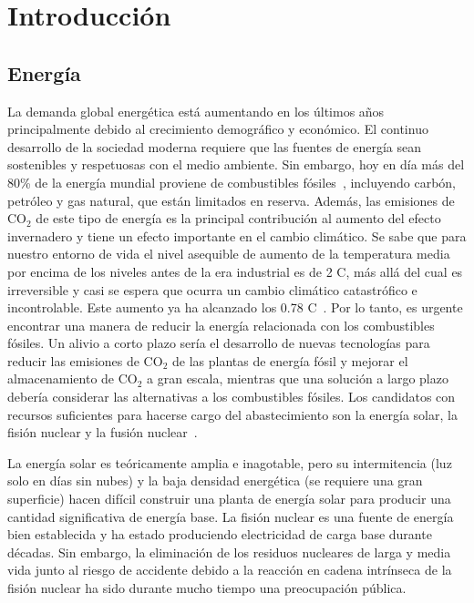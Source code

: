 \chapter{Introducción}\label{ch:intro}
\section{Energía}\label{sec:energy}
La demanda global energética está aumentando en los últimos años principalmente debido al crecimiento demográfico y económico.
El continuo desarrollo de la sociedad moderna requiere que las fuentes de energía sean sostenibles
y respetuosas con el medio ambiente. Sin embargo, hoy en día más del 80\% de la energía mundial proviene
de combustibles fósiles~\cite{/content/publication/caf32f3b-en}, incluyendo carbón, petróleo y gas natural, que están limitados en reserva.
Además, las emisiones de CO$_2$ de este tipo de energía es la principal contribución al aumento del 
efecto invernadero y tiene un efecto importante en el cambio climático. Se
sabe que para nuestro entorno de vida el nivel asequible de aumento de la
temperatura media por encima de los niveles antes de la era industrial es de 2 \centigrade C, más allá del cual es irreversible y casi
se espera que ocurra un cambio climático catastrófico e incontrolable. Este aumento ya ha alcanzado los 0.78 \centigrade C~\cite{ip02000c}.
Por lo tanto, es urgente encontrar una manera de reducir la energía relacionada con
los combustibles fósiles. Un alivio a corto plazo sería el desarrollo de nuevas tecnologías para
reducir las emisiones de CO$_2$ de las plantas de energía fósil y mejorar el almacenamiento de CO$_2$ a gran escala,
mientras que una solución a largo plazo debería considerar las alternativas a los combustibles fósiles. Los candidatos con recursos suficientes para hacerse cargo del abastecimiento son la energía solar, la fisión nuclear y
la fusión nuclear~\cite{Freidberg:1186225}.\par
La energía solar es teóricamente amplia e inagotable, pero su intermitencia (luz solo en días sin nubes) y la baja densidad energética (se requiere una gran superficie) hacen difícil construir
una planta de energía solar para producir una cantidad significativa de energía base. La fisión nuclear es
una fuente de energía bien establecida y ha estado produciendo electricidad de carga base durante décadas.
Sin embargo, la eliminación de los residuos nucleares de larga y media vida junto al riesgo de accidente debido a la
reacción en cadena intrínseca de la fisión nuclear ha sido durante mucho tiempo una preocupación pública.\par
